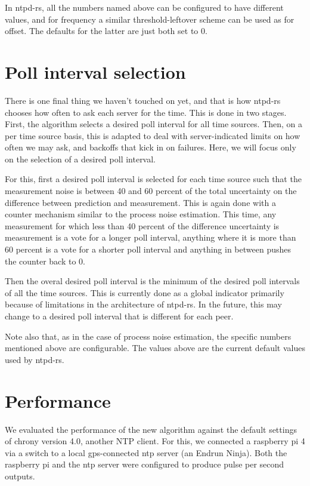 \documentclass{article}
\begin{document}
In ntpd-rs, all the numbers named above can be configured to have different values, and for frequency a similar threshold-leftover scheme can be used as for offset.
The defaults for the latter are just both set to 0.

\section{Poll interval selection}

There is one final thing we haven't touched on yet, and that is how ntpd-rs chooses how often to ask each server for the time. This is done in two stages. First, the algorithm selects a desired poll interval for all time sources. Then, on a per time source basis, this is adapted to deal with server-indicated limits on how often we may ask, and backoffs that kick in on failures. Here, we will focus only on the selection of a desired poll interval.

For this, first a desired poll interval is selected for each time source such that the measurement noise is between 40 and 60 percent of the total uncertainty on the difference between prediction and measurement. This is again done with a counter mechanism similar to the process noise estimation. This time, any measurement for which less than 40 percent of the difference uncertainty is measurement is a vote for a longer poll interval, anything where it is more than 60 percent is a vote for a shorter poll interval and anything in between pushes the counter back to 0.

Then the overal desired poll interval is the minimum of the desired poll intervals of all the time sources. This is currently done as a global indicator primarily because of limitations in the architecture of ntpd-rs. In the future, this may change to a desired poll interval that is different for each peer.

Note also that, as in the case of process noise estimation, the specific numbers mentioned above are configurable. The values above are the current default values used by ntpd-rs.

\section{Performance}

We evaluated the performance of the new algorithm against the default settings of chrony version 4.0, another NTP client. For this, we connected a raspberry pi 4 via a switch to a local gps-connected ntp server (an Endrun Ninja). Both the raspberry pi and the ntp server were configured to produce pulse per second outputs.
\end{document}
